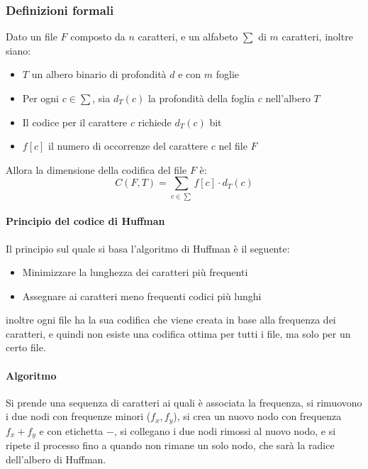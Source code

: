         \subsubsection{Definizioni formali}
            Dato un file $F$ composto da $n$ caratteri, e un alfabeto $\sum$ di $m$ caratteri, inoltre siano:
            \begin{itemize}
                \item $T$ un albero binario di profondità $d$ e con $m$ foglie
                \item Per ogni $c \in \sum$, sia $d_T(c)$ la profondità della foglia $c$ nell'albero $T$
                \item Il codice per il carattere $c$ richiede $d_T(c)$ bit
                \item $f[c]$ il numero di occorrenze del carattere $c$ nel file $F$
            \end{itemize}
            Allora la dimensione della codifica del file $F$ è:
            $$
                C(F,T) = \sum_{c\in \sum} f[c] \cdot d_T(c)
            $$
            \paragraph{Principio del codice di Huffman} Il principio sul quale si basa l'algoritmo di Huffman è il seguente:
            \begin{itemize}
                \item Minimizzare la lunghezza dei caratteri più frequenti
                \item Assegnare ai caratteri meno frequenti codici più lunghi
            \end{itemize}
            inoltre ogni file ha la sua codifica che viene creata in base alla frequenza dei caratteri, e quindi non esiste una codifica ottima per tutti i file, ma solo per un certo file.
            \paragraph{Algoritmo} Si prende una sequenza di caratteri ai quali è associata la frequenza, si rimuovono i due nodi con frequenze minori ($f_x, f_y$), si crea un nuovo nodo con frequenza $f_x + f_y$ e con etichetta $-$, si collegano i due nodi rimossi al nuovo nodo, e si ripete il processo fino a quando non rimane un solo nodo, che sarà la radice dell'albero di Huffman.
